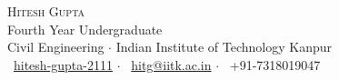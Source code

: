 \newcommand{\sep}{$\cdot$ }  %

\begin{center}

\textsc{\huge Hitesh Gupta}\\[2mm]
Fourth Year Undergraduate\\[1mm]
Civil Engineering \sep Indian Institute of Technology Kanpur\\[1mm]
{\faGithub\ \href{https://github.com/hitesh-gupta-2111}{hitesh-gupta-2111}} \sep
{\faEnvelopeO\ \href{mailto:hitg@iitk.ac.in}{hitg@iitk.ac.in}} \sep
{\faMobile\ +91-7318019047}

\end{center}
